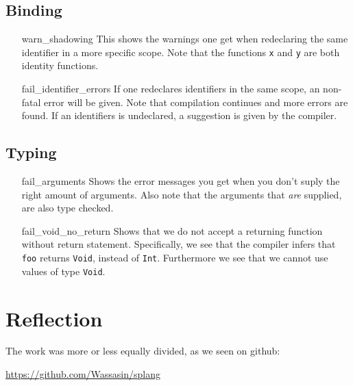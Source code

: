 \documentclass[14pt]{amsart}
\begin{document}
\subsection{Binding}
\begin{itemize}
	\item[warn\_shadowing] This shows the warnings one get when redeclaring the same identifier in a more specific scope. Note that the functions \texttt{x} and \texttt{y} are both identity functions.
	\item[fail\_identifier\_errors] If one redeclares identifiers in the same scope, an non-fatal error will be given. Note that compilation continues and more errors are found. If an identifiers is undeclared, a suggestion is given by the compiler.
\end{itemize}
\subsection{Typing}
\begin{itemize}
	\item[fail\_arguments] Shows the error messages you get when you don't suply the right amount of arguments. Also note that the arguments that \emph{are} supplied, are also type checked.
	\item[fail\_void\_no\_return] Shows that we do not accept a returning function without return statement. Specifically, we see that the compiler infers that \texttt{foo} returns \texttt{Void}, instead of \texttt{Int}. Furthermore we see that we cannot use values of type \texttt{Void}.
\end{itemize}

\section{Reflection}
The work was more or less equally divided, as we seen on github:

\url{https://github.com/Wassasin/splang}
\end{document}
